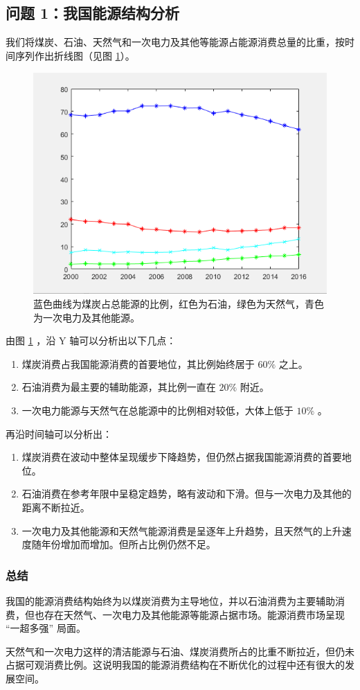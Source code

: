 \subsection{问题 1：我国能源结构分析}

  我们将煤炭、石油、天然气和一次电力及其他等能源占能源消费总量的比重，按时间序列作出折线图（见图 \ref{fig:nenyuanxiaofeibizhong}）。
  \begin{figure}[hb]
    \centering
    \includegraphics[scale=0.6]{figures/fig1.png}
    \captionsetup{format=hang}
    \caption[煤炭、石油、天然气和一次电力及其他等能源占能源消费总量的比重]{蓝色曲线为煤炭占总能源的比例，红色为石油，绿色为天然气，青色为一次电力及其他能源。}
    \label{fig:nenyuanxiaofeibizhong}
  \end{figure}

  由图 \ref{fig:nenyuanxiaofeibizhong} ，沿 $\mathrm{Y}$ 轴可以分析出以下几点：
  \begin{enumerate}
    \item 煤炭消费占我国能源消费的首要地位，其比例始终居于 $60\%$ 之上。
    \item 石油消费为最主要的辅助能源，其比例一直在 $20\%$ 附近。
    \item 一次电力能源与天然气在总能源中的比例相对较低，大体上低于 $10\%$ 。
  \end{enumerate}

  再沿时间轴可以分析出：
  \begin{enumerate}
    \item 煤炭消费在波动中整体呈现缓步下降趋势，但仍然占据我国能源消费的首要地位。
    \item 石油消费在参考年限中呈稳定趋势，略有波动和下滑。但与一次电力及其他的距离不断拉近。
    \item 一次电力及其他能源和天然气能源消费是呈逐年上升趋势，且天然气的上升速度随年份增加而增加。但所占比例仍然不足。
  \end{enumerate}

  \subsubsection{总结}
  我国的能源消费结构始终为以煤炭消费为主导地位，并以石油消费为主要辅助消费，但也存在天然气、一次电力及其他能源等能源占据市场。能源消费市场呈现 “一超多强” 局面。
  
  天然气和一次电力这样的清洁能源与石油、煤炭消费所占的比重不断拉近，但仍未占据可观消费比例。这说明我国的能源消费结构在不断优化的过程中还有很大的发展空间。